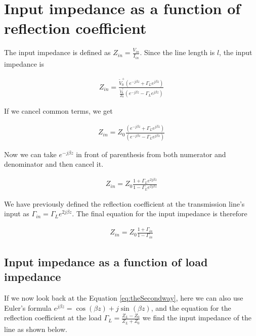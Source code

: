 \documentclass{ximera}
\begin{document}
\section{Input impedance as a function of reflection coefficient}

The input impedance is defined as $Z_{in}=\frac{V_{in}}{I_{in}}$. Since the line length is $l$, the input impedance is





\begin{eqnarray}
Z_{in}=\frac{\tilde{V}_0^+ (e^{-j \beta z} + \Gamma_L  e^{j \beta z }  )}{\frac{\tilde{V}_0^+}{Z_0}  (e^{-j \beta z} - \Gamma_L  e^{j \beta z}  )}
\end{eqnarray}

If we cancel common terms, we get

\begin{eqnarray}
Z_{in}=Z_0 \frac{(e^{-j \beta z} + \Gamma_L  e^{j \beta z }  )}{  (e^{-j \beta z} - \Gamma_L  e^{j \beta z}  )} \label{eq:theSecondway}
\end{eqnarray}

Now we can take $e^{-j \beta z}$ in front of parenthesis from both numerator and denominator and then cancel it.


\begin{eqnarray}
Z_{in}=Z_0 \frac{1 + \Gamma_L  e^{ 2j \beta z }  }{  1 - \Gamma_L  e^{2j \beta z}  }
\end{eqnarray}

We have previously defined the reflection coefficient at the transmission line's input as $\Gamma_{in}=\Gamma_L  e^{ 2 j \beta z }$. The final equation for the input impedance is therefore




\begin{eqnarray}
Z_{in}=Z_0 \frac{1 + \Gamma_{in}  }{  1 - \Gamma_{in}  }
\end{eqnarray}

\subsection{Input impedance as a function of load impedance}

If we now look back at the Equation \ref{eq:theSecondway}, here we can also  use Euler's formula $e^{j \beta z} = \cos  (\beta z) + j\sin  (\beta z)  $, and the equation for the reflection coefficient at the load $\Gamma_L = \frac{Z_L-Z_0}{Z_L+Z_0}$ we find the input impedance of the line as shown below.
\end{document}
